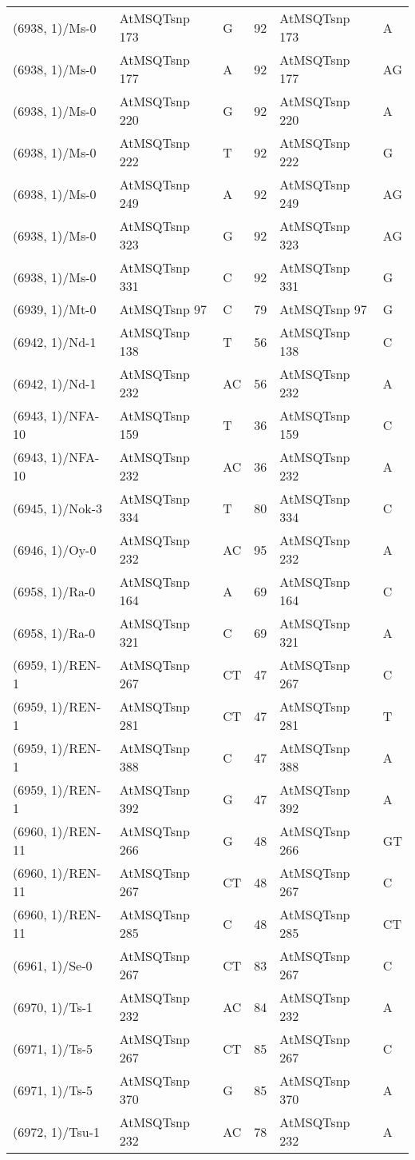 \begin{center}
\begin{longtable}{|l|l|l|l|l|l|}
(6938, 1)/Ms-0&AtMSQTsnp 173&G&92&AtMSQTsnp 173&A\\
(6938, 1)/Ms-0&AtMSQTsnp 177&A&92&AtMSQTsnp 177&AG\\
(6938, 1)/Ms-0&AtMSQTsnp 220&G&92&AtMSQTsnp 220&A\\
(6938, 1)/Ms-0&AtMSQTsnp 222&T&92&AtMSQTsnp 222&G\\
(6938, 1)/Ms-0&AtMSQTsnp 249&A&92&AtMSQTsnp 249&AG\\
(6938, 1)/Ms-0&AtMSQTsnp 323&G&92&AtMSQTsnp 323&AG\\
(6938, 1)/Ms-0&AtMSQTsnp 331&C&92&AtMSQTsnp 331&G\\
(6939, 1)/Mt-0&AtMSQTsnp 97&C&79&AtMSQTsnp 97&G\\
(6942, 1)/Nd-1&AtMSQTsnp 138&T&56&AtMSQTsnp 138&C\\
(6942, 1)/Nd-1&AtMSQTsnp 232&AC&56&AtMSQTsnp 232&A\\
(6943, 1)/NFA-10&AtMSQTsnp 159&T&36&AtMSQTsnp 159&C\\
(6943, 1)/NFA-10&AtMSQTsnp 232&AC&36&AtMSQTsnp 232&A\\
(6945, 1)/Nok-3&AtMSQTsnp 334&T&80&AtMSQTsnp 334&C\\
(6946, 1)/Oy-0&AtMSQTsnp 232&AC&95&AtMSQTsnp 232&A\\
(6958, 1)/Ra-0&AtMSQTsnp 164&A&69&AtMSQTsnp 164&C\\
(6958, 1)/Ra-0&AtMSQTsnp 321&C&69&AtMSQTsnp 321&A\\
(6959, 1)/REN-1&AtMSQTsnp 267&CT&47&AtMSQTsnp 267&C\\
(6959, 1)/REN-1&AtMSQTsnp 281&CT&47&AtMSQTsnp 281&T\\
(6959, 1)/REN-1&AtMSQTsnp 388&C&47&AtMSQTsnp 388&A\\
(6959, 1)/REN-1&AtMSQTsnp 392&G&47&AtMSQTsnp 392&A\\
(6960, 1)/REN-11&AtMSQTsnp 266&G&48&AtMSQTsnp 266&GT\\
(6960, 1)/REN-11&AtMSQTsnp 267&CT&48&AtMSQTsnp 267&C\\
(6960, 1)/REN-11&AtMSQTsnp 285&C&48&AtMSQTsnp 285&CT\\
(6961, 1)/Se-0&AtMSQTsnp 267&CT&83&AtMSQTsnp 267&C\\
(6970, 1)/Ts-1&AtMSQTsnp 232&AC&84&AtMSQTsnp 232&A\\
(6971, 1)/Ts-5&AtMSQTsnp 267&CT&85&AtMSQTsnp 267&C\\
(6971, 1)/Ts-5&AtMSQTsnp 370&G&85&AtMSQTsnp 370&A\\
(6972, 1)/Tsu-1&AtMSQTsnp 232&AC&78&AtMSQTsnp 232&A\\

\end{longtable}
\end{center}
